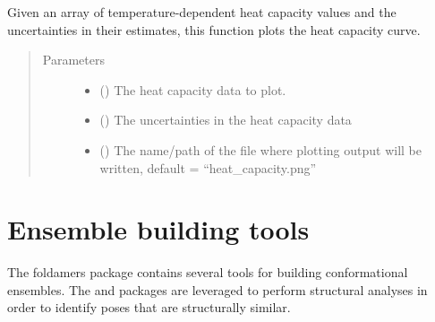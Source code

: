 \documentclass[letterpaper,12pt,english,openany,oneside]{sphinxmanual}
\begin{document}
\begin{fulllineitems}
\label{\detokenize{thermo:thermo.calc.plot_heat_capacity}}
Given an array of temperature-dependent heat capacity values and the uncertainties in their estimates, this function plots the heat capacity curve.
\begin{quote}\begin{description}
\item[{Parameters}] \leavevmode\begin{itemize}
\item {} 
 (\sphinxstyleliteralemphasis{\sphinxupquote{( }}\sphinxstyleliteralemphasis{\sphinxupquote{ )}}) \textendash{} The heat capacity data to plot.

\item {} 
 (\sphinxstyleliteralemphasis{\sphinxupquote{( }}\sphinxstyleliteralemphasis{\sphinxupquote{ )}}) \textendash{} The uncertainties in the heat capacity data

\item {} 
 () \textendash{} The name/path of the file where plotting output will be written, default = “heat\_capacity.png”

\end{itemize}

\end{description}\end{quote}

\end{fulllineitems}



\chapter{Ensemble building tools}
\label{\detokenize{ensembles:ensemble-building-tools}}\label{\detokenize{ensembles::doc}}
The foldamers package contains several tools for building conformational ensembles.  The  and  packages are leveraged to perform structural analyses in order to identify poses that are structurally similar.
\end{document}
